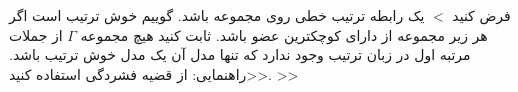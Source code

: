 فرض کنید 
$<$
یک رابطه ترتیب خطی روی مجموعه
باشد. گوییم
خوش ترتیب است اگر هر زیر مجموعه
از 
دارای کوچکترین عضو باشد. ثابت کنید هیچ مجموعه
$\Gamma$
از جملات مرتبه اول در زبان ترتیب وجود ندارد که تنها مدل آن یک مدل خوش ترتیب باشد. 
<<راهنمایی: از قضیه فشردگی استفاده کنید. >>
